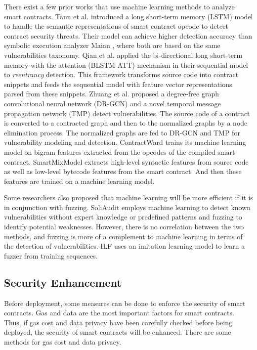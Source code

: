 \documentclass[manuscript,screen]{acmart}
\begin{document}
There exist a few prior works that use machine learning methods to analyze smart contracts. Tann et al. \cite{abs-1811-06632} introduced a long short-term memory (LSTM) \cite{ZhengGWLXLC20} model to handle the semantic representations of smart contract opcode to detect contract security threats. Their model can achieve higher detection accuracy than symbolic execution analyzer Maian \cite{NikolicKSSH18}, where both are based on the same vulnerabilities taxonomy. Qian et al. \cite{QianLHZW20} applied the bi-directional long short-term memory with the attention (BLSTM-ATT) mechanism in their sequential model to \textit{reentrancy} detection. This framework transforms source code into contract snippets and feeds the sequential model with feature vector representations parsed from these snippets.  
Zhuang et al. \cite{ZhuangLQLWH20} proposed a degree-free graph convolutional neural network (DR-GCN) and a novel temporal message propagation network (TMP) detect vulnerabilities. The source code of a contract is converted to a contracted graph and then to the normalized graphs by a node elimination process. The normalized graphs are fed to DR-GCN and TMP for vulnerability modeling and detection.
ContractWard \cite{WangSXLWS21} trains its machine learning model on bigram features extracted from the opcodes of the compiled smart contract.
SmartMixModel \cite{ShakyaMHMC22} extracts high-level syntactic features from source code as well as low-level bytecode features from the smart contract. And then these features are trained on a machine learning model.

Some researchers also proposed that machine learning will be more efficient if it is in conjunction with fuzzing. 
SoliAudit \cite{LiaoTHT19} employs machine learning to detect known vulnerabilities without expert knowledge or predefined patterns and fuzzing to identify potential weaknesses. However, there is no correlation between the two methods, and fuzzing is more of a complement to machine learning in terms of the detection of vulnerabilities.
ILF \cite{HeBATV19} uses an imitation learning model to learn a fuzzer from training sequences.  


\subsection{Security Enhancement}
Before deployment, some measures can be done to enforce the security of smart contracts. Gas and data are the most important factors for smart contracts. Thus, if gas cost and data privacy have been carefully checked before being deployed, the security of smart contracts will be enhanced. There are some methods for gas cost and data privacy.
\end{document}
